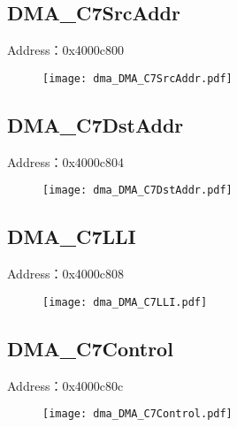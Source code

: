 \subsection{DMA\_C7SrcAddr}
\label{dma-DMA-C7SrcAddr}
Address：0x4000c800
 \begin{figure}[H]
\texttt{[image: dma\_DMA\_C7SrcAddr.pdf]}
\end{figure}

\subsection{DMA\_C7DstAddr}
\label{dma-DMA-C7DstAddr}
Address：0x4000c804
 \begin{figure}[H]
\texttt{[image: dma\_DMA\_C7DstAddr.pdf]}
\end{figure}

\subsection{DMA\_C7LLI}
\label{dma-DMA-C7LLI}
Address：0x4000c808
 \begin{figure}[H]
\texttt{[image: dma\_DMA\_C7LLI.pdf]}
\end{figure}

\subsection{DMA\_C7Control}
\label{dma-DMA-C7Control}
Address：0x4000c80c
 \begin{figure}[H]
\texttt{[image: dma\_DMA\_C7Control.pdf]}
\end{figure}

